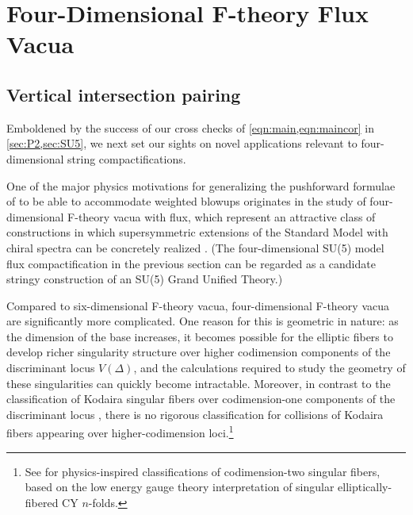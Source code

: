 \documentclass[11pt,oneside,english]{article}
\numberwithin{equation}{section}
\theoremstyle{definition}
\begin{document}
\section{Four-Dimensional F-theory Flux Vacua}
\label{sec:4DFlux}
\subsection{Vertical intersection pairing}
Emboldened by the success of our cross checks of \cref{eqn:main,eqn:maincor} in \cref{sec:P2,sec:SU5}, we next set our sights on novel applications relevant to four-dimensional string compactifications. 

One of the major physics motivations for generalizing the pushforward formulae of \cite{Esole:2017kyr} to be able to accommodate weighted blowups originates in the study of four-dimensional F-theory vacua with flux, which represent an attractive class of constructions in which supersymmetric extensions of the Standard Model with chiral spectra can be concretely realized \cite{Donagi:2008ca,Beasley:2008dc,Beasley:2008kw}. (The four-dimensional SU(5) model flux compactification in the previous section can be regarded as a candidate stringy construction of an SU(5) Grand Unified Theory.)

Compared to six-dimensional F-theory vacua, four-dimensional F-theory vacua are significantly more complicated. One reason for this is geometric in nature: as the dimension of the base increases, it becomes possible for the elliptic fibers to develop richer singularity structure over higher codimension components of the discriminant locus $V(\Delta)$, and the calculations required to study the geometry of these singularities can quickly become intractable. Moreover, in contrast to the classification of Kodaira singular fibers over codimension-one components of the discriminant locus \cite{KodairaII,KodairaIII,NeronClassification}, there is no rigorous classification for collisions of Kodaira fibers appearing over higher-codimension loci.\footnote{See \cite{Hayashi:2014kca,Esole:2015sta,Esole:2016npg} for physics-inspired classifications of codimension-two singular fibers, based on the low energy gauge theory interpretation of singular elliptically-fibered CY $n$-folds.}
\end{document}
